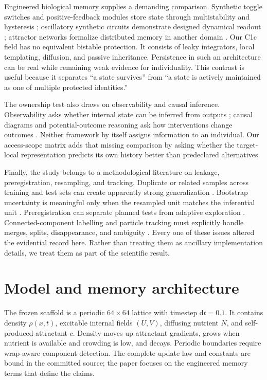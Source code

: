 \documentclass[11pt]{article}
\begin{document}
Engineered biological memory supplies a demanding comparison. Synthetic toggle switches and positive-feedback modules store state through multistability and hysteresis \citep{gardner2000,xiong2003}; oscillatory synthetic circuits demonstrate designed dynamical readout \citep{elowitz2000}; attractor networks formalize distributed memory in another domain \citep{hopfield1982}. Our C1c field has no equivalent bistable protection. It consists of leaky integrators, local templating, diffusion, and passive inheritance. Persistence in such an architecture can be real while remaining weak evidence for individuality. This contrast is useful because it separates ``a state survives'' from ``a state is actively maintained as one of multiple protected identities.''

The ownership test also draws on observability and causal inference. Observability asks whether internal state can be inferred from outputs \citep{hermann1977}; causal diagrams and potential-outcome reasoning ask how interventions change outcomes \citep{rubin1974,pearl1995}. Neither framework by itself assigns information to an individual. Our access-scope matrix adds that missing comparison by asking whether the target-local representation predicts its own history better than predeclared alternatives.

Finally, the study belongs to a methodological literature on leakage, preregistration, resampling, and tracking. Duplicate or related samples across training and test sets can create apparently strong generalization \citep{kaufman2012}. Bootstrap uncertainty is meaningful only when the resampled unit matches the inferential unit \citep{efron1979}. Preregistration can separate planned tests from adaptive exploration \citep{nosek2018}. Connected-component labelling and particle tracking must explicitly handle merges, splits, disappearance, and ambiguity \citep{rosenfeld1966,jaqaman2008}. Every one of these issues altered the evidential record here. Rather than treating them as ancillary implementation details, we treat them as part of the scientific result.

\section{Model and memory architecture}

The frozen scaffold is a periodic $64\times64$ lattice with timestep $\mathrm{d}t=0.1$. It contains density $\rho(x,t)$, excitable internal fields $(U,V)$, diffusing nutrient $N$, and self-produced attractant $c$. Density moves up attractant gradients, grows when nutrient is available and crowding is low, and decays. Periodic boundaries require wrap-aware component detection. The complete update law and constants are bound in the committed source; the paper focuses on the engineered memory terms that define the claims.
\end{document}
